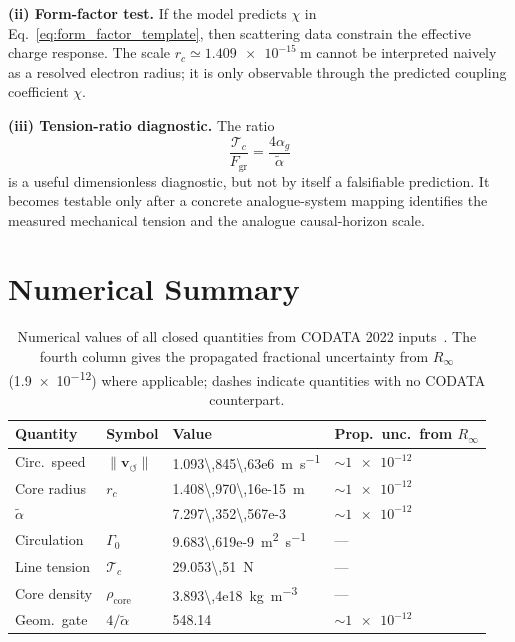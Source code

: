 \documentclass[aps,pra,preprint,longbibliography,nofootinbib]{revtex4-2}
\newcommand{\vnorm}{\lVert\mathbf{v}_{\!\boldsymbol{\circlearrowleft}}\rVert} %
\newcommand{\rhocore}{\rho_{\mathrm{core}}}      %
\newcommand{\rc}{r_c}                            %
\newcommand{\Rinf}{R_\infty}                     %
\newcommand{\Tc}{\mathcal{T}_c}                  %
\newcommand{\Fgr}{F_{\mathrm{gr}}}              %
\newcommand{\Gz}{\Gamma_0}                       %
\begin{document}
\medskip
\noindent\textbf{(ii) Form-factor test.}
If the model predicts $\chi$ in Eq.~\eqref{eq:form_factor_template}, then
scattering data constrain the effective charge response.  The scale
$r_c\simeq\SI{1.409e-15}{\meter}$ cannot be interpreted naively as a
resolved electron radius; it is only observable through the predicted
coupling coefficient $\chi$.

\medskip
\noindent\textbf{(iii) Tension-ratio diagnostic.}
The ratio
\begin{equation}
  \frac{\Tc}{\Fgr}=\frac{4\alpha_g}{\tilde\alpha}
  \label{eq:tension_ratio_diagnostic}
\end{equation}
is a useful dimensionless diagnostic, but not by itself a falsifiable
prediction.  It becomes testable only after a concrete analogue-system
mapping identifies the measured mechanical tension and the analogue
causal-horizon scale.

\section{Numerical Summary}
\label{sec:numerical}

\begin{table}[h]
\centering
\caption{Numerical values of all closed quantities from CODATA 2022
inputs~\cite{MohrTaylor2022}.
The fourth column gives the propagated fractional uncertainty from $\Rinf$
(\num{1.9e-12}) where applicable; dashes indicate quantities with no
CODATA counterpart.}
\label{tab:numbers}
\begin{tabular}{llll}
\toprule
Quantity & Symbol & Value & Prop.\ unc.\ from $\Rinf$ \\
\midrule
Circ.\ speed   & $\vnorm$ & \SI{1.093\,845\,63e6}{\m\per\s}      & $\sim\num{1e-12}$ \\
Core radius    & $\rc$    & \SI{1.408\,970\,16e-15}{\meter}       & $\sim\num{1e-12}$ \\
$\tilde\alpha$ &          & \num{7.297\,352\,567e-3}              & $\sim\num{1e-12}$ \\
Circulation    & $\Gz$    & \SI{9.683\,619e-9}{\m\squared\per\s}  & — \\
Line tension   & $\Tc$    & \SI{29.053\,51}{\newton}               & — \\
Core density   & $\rhocore$& \SI{3.893\,4e18}{\kg\per\m\cubed}    & — \\
Geom.\ gate    & $4/\tilde\alpha$ & \num{548.14}               & $\sim\num{1e-12}$ \\
\bottomrule
\end{tabular}
\end{table}
\end{document}
